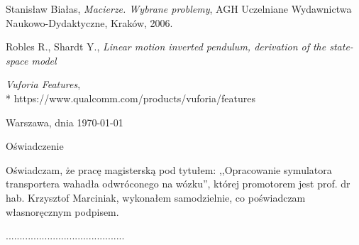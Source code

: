 \documentclass[12pt, oneside]{report}
\theoremstyle{definition}
\begin{document}
	
\pagestyle{plain}
\begin{thebibliography}{11}

 Stanisław Białas, \emph{Macierze. Wybrane problemy}, AGH Uczelniane Wydawnictwa Naukowo-Dydaktyczne, Kraków, 2006.

 Robles R., Shardt Y., \emph{Linear motion inverted pendulum, derivation of the state-space model}

 \emph{Vuforia Features},
\\*
https://www.qualcomm.com/products/vuforia/features

\end{thebibliography}


\clearpage
\pagestyle{empty}
\noindent Warszawa, dnia \today
\vspace{5cm}
\begin{center}
	\LARGE{Oświadczenie}
\end{center}
Oświadczam, że pracę magisterską pod tytułem: ,,Opracowanie symulatora transportera wahadła odwróconego na wózku'', której promotorem jest prof. dr hab. Krzysztof Marciniak, wykonałem samodzielnie, co poświadczam własnoręcznym podpisem.
\vspace{2cm}
\begin{flushright}
...........................................
\end{flushright}
\end{document}
